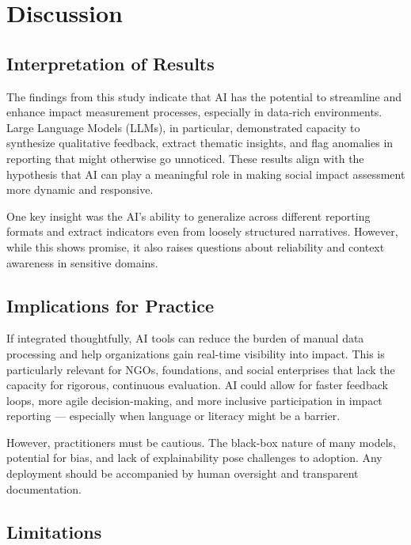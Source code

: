 

\chapter{Discussion}

\section{Interpretation of Results}

The findings from this study indicate that AI has the potential to streamline and enhance impact measurement processes, especially in data-rich environments. Large Language Models (LLMs), in particular, demonstrated capacity to synthesize qualitative feedback, extract thematic insights, and flag anomalies in reporting that might otherwise go unnoticed. These results align with the hypothesis that AI can play a meaningful role in making social impact assessment more dynamic and responsive.

One key insight was the AI's ability to generalize across different reporting formats and extract indicators even from loosely structured narratives. However, while this shows promise, it also raises questions about reliability and context awareness in sensitive domains.

\section{Implications for Practice}

If integrated thoughtfully, AI tools can reduce the burden of manual data processing and help organizations gain real-time visibility into impact. This is particularly relevant for NGOs, foundations, and social enterprises that lack the capacity for rigorous, continuous evaluation. AI could allow for faster feedback loops, more agile decision-making, and more inclusive participation in impact reporting — especially when language or literacy might be a barrier.

However, practitioners must be cautious. The black-box nature of many models, potential for bias, and lack of explainability pose challenges to adoption. Any deployment should be accompanied by human oversight and transparent documentation.

\section{Limitations}

